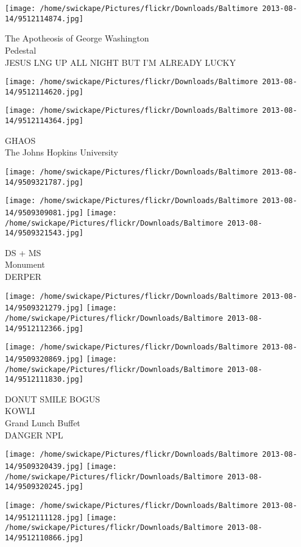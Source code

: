 \documentclass[10pt,letterpaper]{article}
\begin{document}
\texttt{[image: /home/swickape/Pictures/flickr/Downloads/Baltimore 2013-08-14/9512114874.jpg]}

The Apotheosis of George Washington\\
Pedestal\\
JESUS LNG UP ALL NIGHT BUT I'M ALREADY LUCKY
\pagebreak

\texttt{[image: /home/swickape/Pictures/flickr/Downloads/Baltimore 2013-08-14/9512114620.jpg]}

\vspace{0.25in}
\texttt{[image: /home/swickape/Pictures/flickr/Downloads/Baltimore 2013-08-14/9512114364.jpg]}

GHAOS\\
The Johns Hopkins University
\pagebreak

\texttt{[image: /home/swickape/Pictures/flickr/Downloads/Baltimore 2013-08-14/9509321787.jpg]}

\vspace{0.25in}
\texttt{[image: /home/swickape/Pictures/flickr/Downloads/Baltimore 2013-08-14/9509309081.jpg]}
\texttt{[image: /home/swickape/Pictures/flickr/Downloads/Baltimore 2013-08-14/9509321543.jpg]}

DS + MS\\
Monument\\
DERPER
\pagebreak

\texttt{[image: /home/swickape/Pictures/flickr/Downloads/Baltimore 2013-08-14/9509321279.jpg]}
\texttt{[image: /home/swickape/Pictures/flickr/Downloads/Baltimore 2013-08-14/9512112366.jpg]}

\texttt{[image: /home/swickape/Pictures/flickr/Downloads/Baltimore 2013-08-14/9509320869.jpg]}
\texttt{[image: /home/swickape/Pictures/flickr/Downloads/Baltimore 2013-08-14/9512111830.jpg]}

DONUT SMILE BOGUS\\
KOWLI\\
Grand Lunch Buffet\\
DANGER NPL
\pagebreak

\texttt{[image: /home/swickape/Pictures/flickr/Downloads/Baltimore 2013-08-14/9509320439.jpg]}
\texttt{[image: /home/swickape/Pictures/flickr/Downloads/Baltimore 2013-08-14/9509320245.jpg]}

\texttt{[image: /home/swickape/Pictures/flickr/Downloads/Baltimore 2013-08-14/9512111128.jpg]}
\texttt{[image: /home/swickape/Pictures/flickr/Downloads/Baltimore 2013-08-14/9512110866.jpg]}
\end{document}
